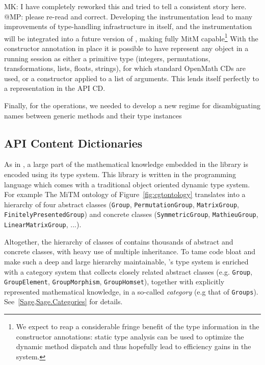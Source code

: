 \begin{newpart}{MK: I have completely reworked this and tried to tell a consistent story
    here. @MP: please re-read and correct.}
Developing the instrumentation lead to many improvements of type-handling infrastructure
in \GAP itself, and the instrumentation will be integrated into a future version of \GAP,
making \GAP fully MitM capable\footnote{We expect to reap a considerable fringe benefit of
  the type information in the constructor annotations: static type analysis can be used to
  optimize the dynamic method dispatch and thus hopefully lead to efficiency gains in the
  system.} With the constructor
annotation in place it is possible to have \GAP represent any object in a running session
as either a primitive type (integers, permutations, transformations, lists, floats,
strings), for which standard OpenMath CDs are used, or a constructor applied to a list of
arguments. This lends itself perfectly to a representation in the \GAP API CD.
 
Finally, for the \GAP operations, we needed to develop a new regime for disambiguating
names between generic methods and their type instances


\subsection{\Sage API Content Dictionaries}

As in \GAP, a large part of the mathematical knowledge embedded in the
\Sage library is encoded using its type system. This library is
written in the \Python programming language which comes with a
traditional object oriented dynamic type system.
For example The MiTM ontology of Figure~\ref{fig:cgtontology}
translates into a hierarchy of four abstract classes (\texttt{Group},
\texttt{PermutationGroup}, \texttt{MatrixGroup},
\texttt{FinitelyPresentedGroup}) and concrete classes
(\texttt{SymmetricGroup}, \texttt{MathieuGroup},
\texttt{LinearMatrixGroup}, ...).

Altogether, the hierarchy of classes of \Sage contains thousands of
abstract and concrete classes, with heavy use of multiple inheritance.
To tame code bloat and make such a deep and large hierarchy
maintainable, \Python's type system is enriched with a category system
that collects closely related abstract classes (e.g. \texttt{Group},
\texttt{GroupElement}, \texttt{GroupMorphism}, \texttt{GroupHomset}),
together with explicitly represented mathematical knowledge, in a
so-called \emph{category} (e.g that of \texttt{Groups}).
See~\ref{Sage,Sage.Categories} for details.


\end{newpart}
